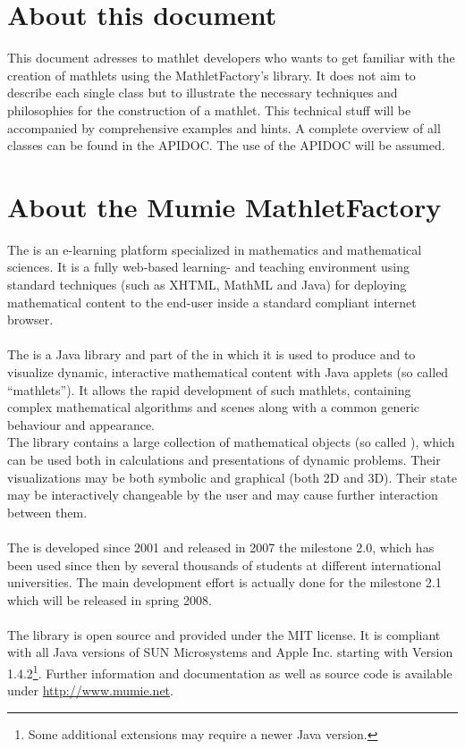
\author{Markus Gronau}

\section{About this document}
  This document adresses to mathlet developers who wants to get familiar with the creation
  of mathlets using the MathletFactory's library. It does not aim to describe each
  single class but to illustrate the necessary techniques and philosophies for the 
  construction of a mathlet. This technical stuff will be accompanied by 
  comprehensive examples and hints. A complete overview of all classes can be found
  in the APIDOC. The use of the APIDOC will be assumed.

\section{About the Mumie MathletFactory}
The \mumie is an e-learning platform specialized in mathematics and mathematical sciences.
It is a fully web-based learning- and teaching environment using standard techniques
(such as XHTML, MathML and Java) for deploying mathematical content to the end-user inside 
a standard compliant internet browser.\\
\\
The \mf is a Java library and part of the \mumie in which it is used to produce and to visualize
dynamic, interactive mathematical content with Java applets (so called ``mathlets''). It allows
the rapid development of such mathlets, containing complex mathematical algorithms and scenes
along with a common generic behaviour and appearance.\\
The \mf library contains a large collection of mathematical objects (so called \mmos), which can 
be used both in calculations and presentations of dynamic problems.
Their visualizations may be both symbolic and graphical (both 2D and 3D).
Their state may be interactively changeable by the user and may cause further interaction between them.\\
\\
The \mf is developed since 2001 and released in 2007 the milestone 2.0, which has been used since then by
several thousands of students at different international universities. The main development
effort is actually done for the milestone 2.1 which will be released in spring 2008.\\
\\
The \mf library is open source and provided under the MIT license. It is compliant with 
all Java versions of SUN Microsystems and Apple Inc. starting with Version 1.4.2\footnote{Some 
additional extensions may require a newer Java version.}. Further information and documentation 
as well as source code is available under \url{http://www.mumie.net}.

